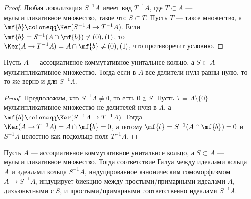 \documentclass[
	extrafontsizes,
	11pt,
	hyphens,
]{memoir}
\begin{document}
\begin{proof}
Любая локализация \(S^{-1}A\) имеет вид \(T^{-1}A\), где \(T \subset A\) --- мультипликативное множество, такое что \(S \subset T\).
Пусть \(T\) --- такое множество, а \(\mf{b} \coloneqq \Ker(S^{-1}A \to T^{-1}A)\).
Если \(\mf{b} = S^{-1}(A \cap \mf{b}) \neq (0), (1)\), то \(\Ker(A \to T^{-1}A) = A \cap \mf{b} \neq (0), (1)\), что противоречит условию.
\end{proof}

\begin{theorem}
\label{thm:LocCommRingZerodiv2}
Пусть \(A\) --- ассоциативное коммутативное унитальное кольцо,
а \(S \subset A\) --- мультипликативное множество.
Тогда если в \(A\) все делители нуля равны нулю, то то же верно и для \(S^{-1}A\).
\end{theorem}

\begin{proof}
Предположим, что \(S^{-1}A \neq 0\), то есть \(0 \notin S\).
Пусть \(T = A \setminus \{0\}\) --- мультипликативное множество не делителей нуля в \(A\), а \(\mf{b} \coloneqq \Ker(S^{-1}A \to T^{-1}A)\).
Тогда \(\Ker(A \to T^{-1}A) = A \cap \mf{b} = 0\),
а потому \(\mf{b} = S^{-1}(A \cap \mf{b}) = 0\) и \(S^{-1}A\) целостно как подкольцо поля \(T^{-1}A\).
\end{proof}

\begin{corollary}%
Пусть \(A\) --- ассоциативное коммутативное унитальное кольцо, а \(S \subset A\) --- мультипликативное множество.
Тогда соответствие Галуа между идеалами кольца \(A\) и идеалами кольца \(S^{-1}A\), индуцированное каноническим гомоморфизмом \(A \to S^{-1}A\), индуцирует биекцию между про\-сты\-ми/при\-мар\-ны\-ми идеалами \(A\), дизъюнктными с \(S\), и про\-сты\-ми/при\-мар\-ны\-ми соответственно идеалами \(S^{-1}A\).
\end{corollary}


\end{document}

